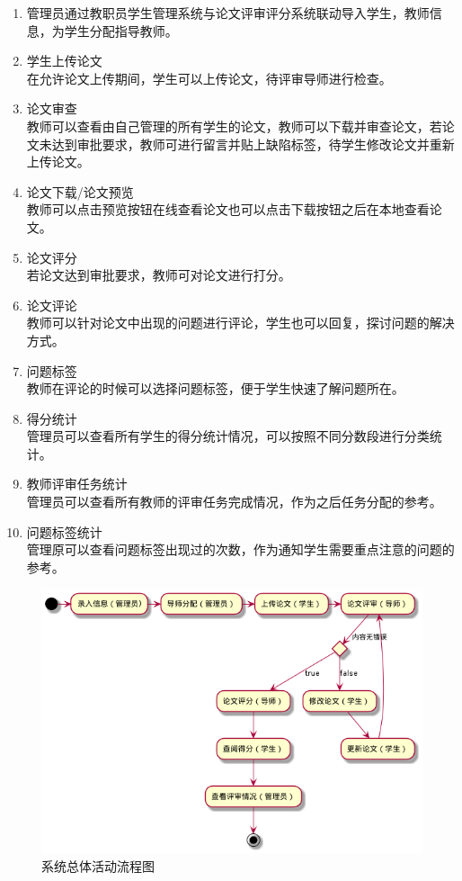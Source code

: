 \begin{enumerate}
    \item 管理员通过教职员学生管理系统与论文评审评分系统联动导入学生，教师信息，为学生分配指导教师。
    \item 学生上传论文\\
          在允许论文上传期间，学生可以上传论文，待评审导师进行检查。
    \item 论文审查\\
          教师可以查看由自己管理的所有学生的论文，教师可以下载并审查论文，若论文未达到审批要求，教师可进行留言并贴上缺陷标签，待学生修改论文并重新上传论文。
    \item 论文下载/论文预览\\
          教师可以点击预览按钮在线查看论文也可以点击下载按钮之后在本地查看论文。
    \item 论文评分\\
          若论文达到审批要求，教师可对论文进行打分。
    \item 论文评论\\
          教师可以针对论文中出现的问题进行评论，学生也可以回复，探讨问题的解决方式。
    \item 问题标签\\
          教师在评论的时候可以选择问题标签，便于学生快速了解问题所在。
    \item 得分统计\\
          管理员可以查看所有学生的得分统计情况，可以按照不同分数段进行分类统计。
    \item 教师评审任务统计\\
          管理员可以查看所有教师的评审任务完成情况，作为之后任务分配的参考。
    \item 问题标签统计\\
          管理原可以查看问题标签出现过的次数，作为通知学生需要重点注意的问题的参考。

\end{enumerate}

\begin{figure}[H]
    \centering
    \includegraphics[scale = 0.6]{out/uml/流程图/系统总体活动流程图/系统总体活动流程图.png}
    \caption{\song\wuhao 系统总体活动流程图}
\end{figure}


